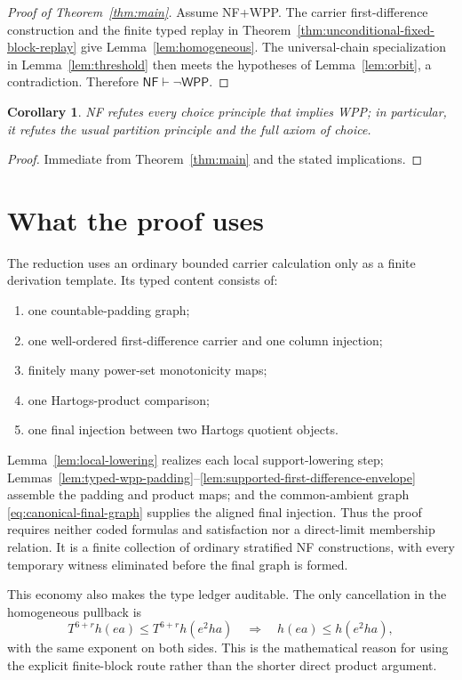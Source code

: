 \documentclass[11pt]{article}
\newtheorem{corollary}[theorem]{Corollary}
\numberwithin{equation}{section}
\theoremstyle{definition}
\theoremstyle{remark}
\newcommand{\NF}{\mathsf{NF}}
\newcommand{\WPP}{\mathsf{WPP}}
\begin{document}
\begin{proof}[Proof of Theorem~\ref{thm:main}]
Assume NF+WPP.  The carrier first-difference construction and the finite
typed replay in Theorem~\ref{thm:unconditional-fixed-block-replay} give
Lemma~\ref{lem:homogeneous}.  The universal-chain specialization in
Lemma~\ref{lem:threshold} then meets the hypotheses of
Lemma~\ref{lem:orbit}, a contradiction.  Therefore
\(\NF\vdash\neg\WPP\).
\end{proof}

\begin{corollary}
NF refutes every choice principle that implies WPP; in particular, it
refutes the usual partition principle and the full axiom of choice.
\end{corollary}

\begin{proof}
Immediate from Theorem~\ref{thm:main} and the stated implications.
\end{proof}

\section{What the proof uses}

The reduction uses an ordinary bounded carrier calculation only as a
finite derivation template.  Its typed content consists of:
\begin{enumerate}[(1)]
\item one countable-padding graph;
\item one well-ordered first-difference carrier and one column injection;
\item finitely many power-set monotonicity maps;
\item one Hartogs-product comparison;
\item one final injection between two Hartogs quotient objects.
\end{enumerate}
Lemma~\ref{lem:local-lowering} realizes each local support-lowering step;
Lemmas~\ref{lem:typed-wpp-padding}--\ref{lem:supported-first-difference-envelope}
assemble the padding and product maps; and the common-ambient graph
\eqref{eq:canonical-final-graph} supplies the aligned final injection.
Thus the proof requires neither coded formulas and satisfaction nor a
direct-limit membership relation.  It is a finite collection of ordinary
stratified NF constructions, with every temporary witness eliminated
before the final graph is formed.

This economy also makes the type ledger auditable.  The only cancellation
in the homogeneous pullback is
\[
 T^{6+r}h(ea)\leq T^{6+r}h(e^2ha)
 \quad\Longrightarrow\quad
 h(ea)\leq h(e^2ha),
\]
with the same exponent on both sides.  This is the mathematical reason for
using the explicit finite-block route rather than the shorter direct
product argument.
\end{document}
